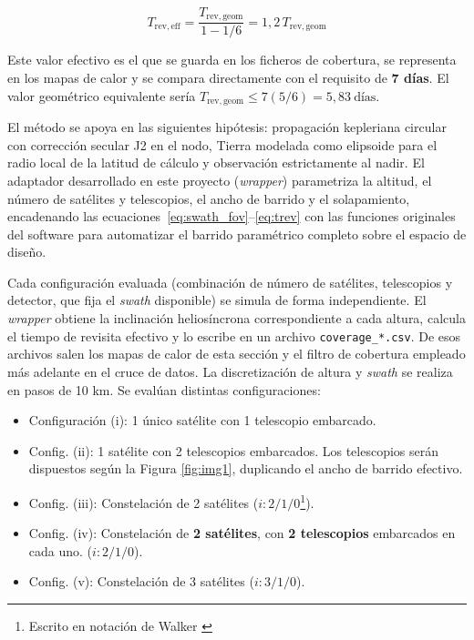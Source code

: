 \begin{equation}
T_{\mathrm{rev,eff}}=\frac{T_{\mathrm{rev,geom}}}{1-1/6}=1{,}2\,T_{\mathrm{rev,geom}}
\label{eq:trev_eff}
\end{equation}

Este valor efectivo es el que se guarda en los ficheros de cobertura, se representa en los mapas de calor y se compara directamente con el requisito de \textbf{7 días}. El valor geométrico equivalente sería $T_{\mathrm{rev,geom}}\leq 7(5/6)=5{,}83\ \text{días}$.

El método se apoya en las siguientes hipótesis: propagación kepleriana circular con corrección secular J2 en el nodo, Tierra modelada como elipsoide para el radio local de la latitud de cálculo y observación estrictamente al nadir. El adaptador desarrollado en este proyecto (\textit{wrapper}) parametriza la altitud, el número de satélites y telescopios, el ancho de barrido y el solapamiento, encadenando las ecuaciones~\eqref{eq:swath_fov}--\eqref{eq:trev} con las funciones originales del software para automatizar el barrido paramétrico completo sobre el espacio de diseño.

Cada configuración evaluada (combinación de número de satélites, telescopios y detector, que fija el \textit{swath} disponible) se simula de forma independiente. El \textit{wrapper} obtiene la inclinación heliosíncrona correspondiente a cada altura, calcula el tiempo de revisita efectivo y lo escribe en un archivo \texttt{coverage\_*.csv}. De esos archivos salen los mapas de calor de esta sección y el filtro de cobertura empleado más adelante en el cruce de datos. La discretización de altura y \textit{swath} se realiza en pasos de 10 km. Se evalúan distintas configuraciones:

\begin{itemize}
    \item Configuración (i): 1 único satélite con 1 telescopio embarcado.
    \item Config. (ii): 1 satélite con 2 telescopios embarcados. Los telescopios serán dispuestos según la Figura \ref{fig:img1}, duplicando el ancho de barrido efectivo.
    \item Config. (iii): Constelación de 2 satélites ($i:2/1/0$\footnote{Escrito en notación de Walker \cite{walker1991phase}}).
    \item Config. (iv): Constelación de \textbf{2 satélites}, con \textbf{2 telescopios} embarcados en cada uno. ($i:2/1/0$).
    \item Config. (v): Constelación de 3 satélites ($i:3/1/0$).
\end{itemize}

